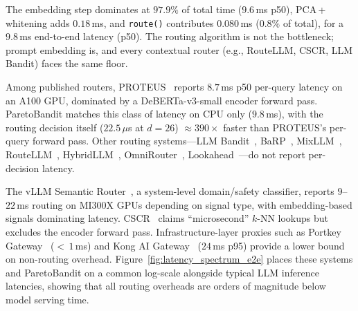\begin{table}[t]
\centering
\caption{End-to-end latency breakdown for ParetoBandit's production
CPU pipeline.  Reported values are p50 and p95 over 200 measured
iterations after a 50-iteration warmup; percentages are computed
relative to the p50 total.}
\label{tab:e2e_latency_breakdown}
\footnotesize
\setlength{\tabcolsep}{4pt}
\end{table}

\noindent
The embedding step dominates at $97.9\%$ of total time ($9.6$\,ms
p50), PCA\,+\,whitening adds $0.18$\,ms, and \texttt{route()}
contributes $0.080$\,ms ($0.8\%$ of total), for a $9.8$\,ms
end-to-end latency (p50).
The routing algorithm is not the bottleneck; prompt embedding is, and
every contextual router (e.g., RouteLLM, CSCR, LLM Bandit) faces the
same floor.

Among published routers, PROTEUS~\cite{bhatti2026proteus} reports
$8.7$\,ms p50 per-query latency on an A100 GPU, dominated by a
DeBERTa-v3-small encoder forward pass.
ParetoBandit matches this class of latency on CPU only ($9.8$\,ms),
with the routing decision itself ($22.5\,\mu$s at $d{=}26$)
${\approx}390{\times}$ faster than PROTEUS's per-query forward pass.
Other routing systems---LLM
Bandit~\cite{li2025llmbandit}, BaRP~\cite{wang2025barp},
MixLLM~\cite{wang2025mixllm}, RouteLLM~\cite{ong2024routellm},
HybridLLM~\cite{ding2024hybridllm},
OmniRouter~\cite{mei2025omnirouter},
Lookahead~\cite{sun2025lookahead}---do not report per-decision
latency.

The vLLM Semantic Router~\cite{liu2026vllmsr}, a system-level
domain/safety classifier, reports $9$--$22$\,ms routing on MI300X GPUs
depending on signal type, with embedding-based signals dominating
latency.
CSCR~\cite{shirkavand2025cscr} claims ``microsecond'' $k$-NN lookups
but excludes the encoder forward pass.
Infrastructure-layer proxies such as Portkey
Gateway~\cite{portkey2025} (${<}\,1$\,ms) and Kong AI
Gateway~\cite{konghq2025benchmark} ($24$\,ms p95) provide a lower
bound on non-routing overhead.
Figure~\ref{fig:latency_spectrum_e2e} places these systems and
ParetoBandit on a common log-scale alongside typical LLM inference
latencies, showing that all routing overheads are orders of magnitude
below model serving time.

